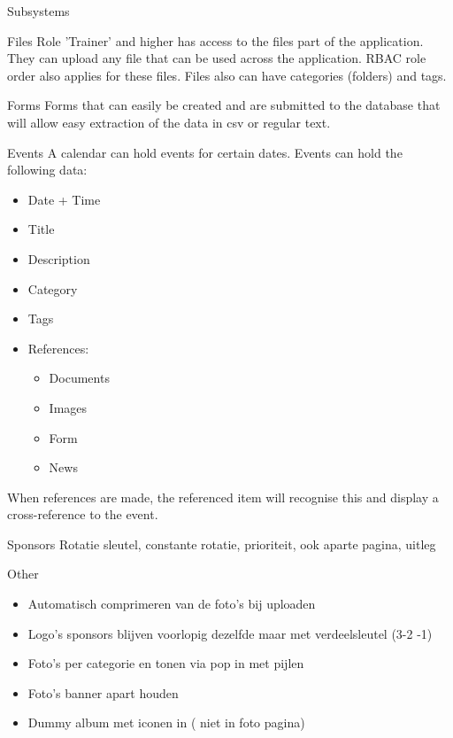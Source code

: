\documentclass[10pt,a4paper]{article}
\begin{document}
\begin{section}{Subsystems}
    \begin{subsection}{Files}
        Role 'Trainer' and higher has access to the files part of the application.
        They can upload any file that can be used across the application. RBAC role order
        also applies for these files. Files also can have categories (folders) and tags.
    \end{subsection}
    
    \begin{subsection}{Forms}
        Forms that can easily be created and are submitted to the database that will
        allow easy extraction of the data in csv or regular text.
    \end{subsection}
    
    \begin{subsection}{Events}
        A calendar can hold events for certain dates.
        Events can hold the following data:
        \begin{itemize}
            \item Date + Time
            \item Title
            \item Description
            \item Category
            \item Tags
            \item References:
            \begin{itemize}
                \item Documents
                \item Images
                \item Form
                \item News
            \end{itemize}
        \end{itemize}
        When references are made, the referenced item will recognise this and display
        a cross-reference to the event.
    \end{subsection}
    
    \begin{subsection}{Sponsors}
        Rotatie sleutel, constante rotatie, prioriteit, ook aparte pagina, uitleg
    \end{subsection}
    
    \begin{subsection}{Other}
        \begin{itemize}
            \item Automatisch comprimeren van de foto’s bij uploaden
            \item Logo’s sponsors blijven voorlopig dezelfde  maar met verdeelsleutel (3-2 -1)
            \item Foto’s per categorie en tonen via  pop in met pijlen
            \item Foto’s banner apart houden
            \item Dummy album met iconen in ( niet in foto pagina)
        \end{itemize}
    \end{subsection}
\end{section}
\end{document}
